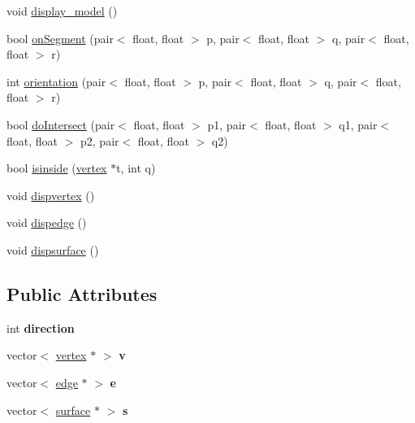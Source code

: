 \begin{DoxyCompactItemize}
\item 
void \hyperlink{classmodel__2d_a03c3b12aaca8688832f4bc7d5301b5fe}{display\+\_\+model} ()
\item 
bool \hyperlink{classmodel__2d_a9615c9abb5627d8742ccddf03cbeae91}{on\+Segment} (pair$<$ float, float $>$ p, pair$<$ float, float $>$ q, pair$<$ float, float $>$ r)
\item 
int \hyperlink{classmodel__2d_a5d04aa594874b332d9938df13bff0d54}{orientation} (pair$<$ float, float $>$ p, pair$<$ float, float $>$ q, pair$<$ float, float $>$ r)
\item 
bool \hyperlink{classmodel__2d_ad61a6338b0631bbe61ab6caeab36ebaf}{do\+Intersect} (pair$<$ float, float $>$ p1, pair$<$ float, float $>$ q1, pair$<$ float, float $>$ p2, pair$<$ float, float $>$ q2)
\item 
bool \hyperlink{classmodel__2d_ab09798577266c0d7a83de6bbeb3a5f32}{isinside} (\hyperlink{classvertex}{vertex} $\ast$t, int q)
\item 
void \hyperlink{classmodel__2d_a1244480a2e46cf85f622324895855e98}{dispvertex} ()
\item 
void \hyperlink{classmodel__2d_a41dbf981ec2c7df95bd227aded96e99a}{dispedge} ()
\item 
void \hyperlink{classmodel__2d_a4a1ba007053ebe9bd443abaeeda8df83}{dispsurface} ()
\end{DoxyCompactItemize}
\subsection*{Public Attributes}
\begin{DoxyCompactItemize}
\item 
int {\bfseries direction}\hypertarget{classmodel__2d_a549e12acad9d94f8115252497524cf19}{}\label{classmodel__2d_a549e12acad9d94f8115252497524cf19}

\item 
vector$<$ \hyperlink{classvertex}{vertex} $\ast$ $>$ {\bfseries v}\hypertarget{classmodel__2d_acb0399caf2660e0203e473969fbe9d27}{}\label{classmodel__2d_acb0399caf2660e0203e473969fbe9d27}

\item 
vector$<$ \hyperlink{classedge}{edge} $\ast$ $>$ {\bfseries e}\hypertarget{classmodel__2d_a3b4836d70d42e5c2ed90a8495c430a0f}{}\label{classmodel__2d_a3b4836d70d42e5c2ed90a8495c430a0f}

\item 
vector$<$ \hyperlink{classsurface}{surface} $\ast$ $>$ {\bfseries s}\hypertarget{classmodel__2d_aa4aaa097b9f187e9806981ad33368f35}{}\label{classmodel__2d_aa4aaa097b9f187e9806981ad33368f35}

\end{DoxyCompactItemize}


